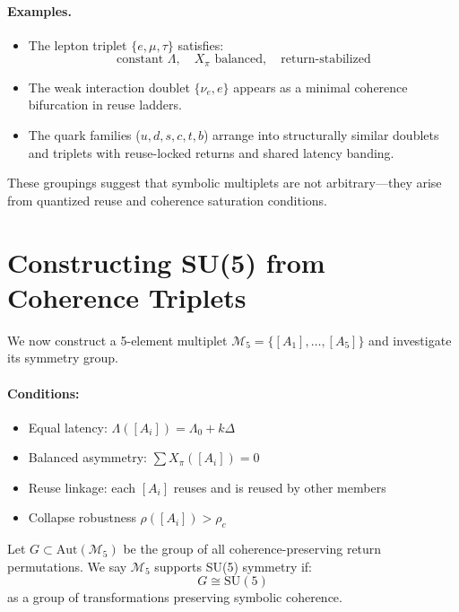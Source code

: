 \paragraph{Examples.}

\begin{itemize}
  \item The lepton triplet \( \{e, \mu, \tau\} \) satisfies:
  \[
  \text{constant } \Lambda, \quad X_\pi \text{ balanced}, \quad \text{return-stabilized}
  \]
  \item The weak interaction doublet \( \{\nu_e, e\} \) appears as a minimal coherence bifurcation in reuse ladders.
  \item The quark families (\( u, d, s, c, t, b \)) arrange into structurally similar doublets and triplets with reuse-locked returns and shared latency banding.
\end{itemize}

These groupings suggest that symbolic multiplets are not arbitrary—they arise from quantized reuse and coherence saturation conditions.

\section{Constructing SU(5) from Coherence Triplets}

We now construct a 5-element multiplet \( \mathcal{M}_5 = \{[A_1], \dots, [A_5]\} \) and investigate its symmetry group.

\paragraph{Conditions:}
\begin{itemize}
  \item Equal latency: \( \Lambda([A_i]) = \Lambda_0 + k\Delta \)
  \item Balanced asymmetry: \( \sum X_\pi([A_i]) = 0 \)
  \item Reuse linkage: each \( [A_i] \) reuses and is reused by other members
  \item Collapse robustness \( \rho([A_i]) > \rho_c \)
\end{itemize}

\begin{definition}
Let \( G \subset \text{Aut}(\mathcal{M}_5) \) be the group of all coherence-preserving return permutations. We say \( \mathcal{M}_5 \) supports SU(5) symmetry if:
\[
G \cong \text{SU}(5)
\]
as a group of transformations preserving symbolic coherence.
\end{definition}

